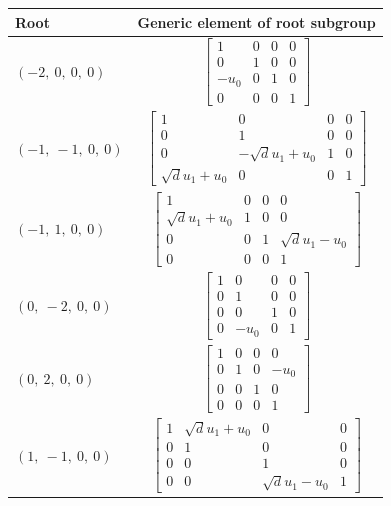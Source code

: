 \documentclass[11pt]{article}
\theoremstyle{definition}
\begin{document}
\noindent \begin{longtable}{|l|c|}
    \hline
    \textbf{Root} & \textbf{Generic element of root subgroup} \\
    \hline
    \endhead
    $\left( -2, \  0, \  0, \  0\right)$ & ${\left[\begin{matrix}1 & 0 & 0 & 0\\0 & 1 & 0 & 0\\- u_{0} & 0 & 1 & 0\\0 & 0 & 0 & 1\end{matrix}\right]}$ \\
    \hline
    $\left( -1, \  -1, \  0, \  0\right)$ & ${\left[\begin{matrix}1 & 0 & 0 & 0\\0 & 1 & 0 & 0\\0 & - \sqrt{d} u_{1} + u_{0} & 1 & 0\\\sqrt{d} u_{1} + u_{0} & 0 & 0 & 1\end{matrix}\right]}$ \\
    \hline
    $\left( -1, \  1, \  0, \  0\right)$ & ${\left[\begin{matrix}1 & 0 & 0 & 0\\\sqrt{d} u_{1} + u_{0} & 1 & 0 & 0\\0 & 0 & 1 & \sqrt{d} u_{1} - u_{0}\\0 & 0 & 0 & 1\end{matrix}\right]}$ \\
    \hline
    $\left( 0, \  -2, \  0, \  0\right)$ & ${\left[\begin{matrix}1 & 0 & 0 & 0\\0 & 1 & 0 & 0\\0 & 0 & 1 & 0\\0 & - u_{0} & 0 & 1\end{matrix}\right]}$ \\
    \hline
    $\left( 0, \  2, \  0, \  0\right)$ & ${\left[\begin{matrix}1 & 0 & 0 & 0\\0 & 1 & 0 & - u_{0}\\0 & 0 & 1 & 0\\0 & 0 & 0 & 1\end{matrix}\right]}$ \\
    \hline
    $\left( 1, \  -1, \  0, \  0\right)$ & ${\left[\begin{matrix}1 & \sqrt{d} u_{1} + u_{0} & 0 & 0\\0 & 1 & 0 & 0\\0 & 0 & 1 & 0\\0 & 0 & \sqrt{d} u_{1} - u_{0} & 1\end{matrix}\right]}$ \\

\end{longtable}
\end{document}
